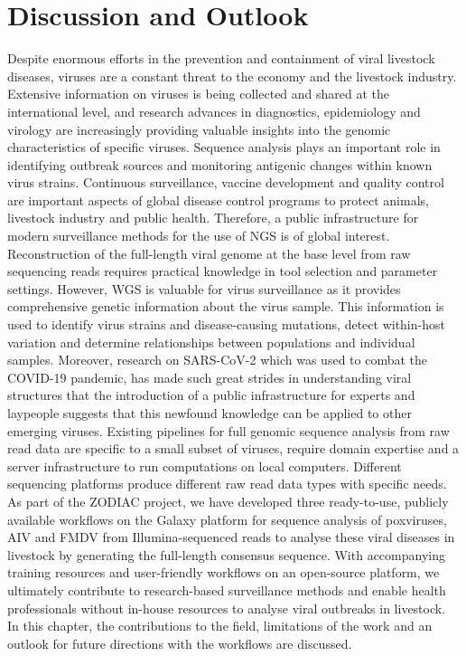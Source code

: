 \chapter{Discussion and Outlook}\label{chap:discussion}
Despite enormous efforts in the prevention and containment of viral livestock diseases, viruses are a constant threat to the economy and the livestock industry. Extensive information on viruses is being collected and shared at the international level, and research advances in diagnostics, epidemiology and virology are increasingly providing valuable insights into the genomic characteristics of specific viruses. Sequence analysis plays an important role in identifying outbreak sources and monitoring antigenic changes within known virus strains. Continuous surveillance, vaccine development and quality control are important aspects of global disease control programs to protect animals, livestock industry and public health. Therefore, a public infrastructure for modern surveillance methods for the use of \ac{NGS} is of global interest. Reconstruction of the full-length viral genome at the base level from raw sequencing reads requires practical knowledge in tool selection and parameter settings. However, \ac{WGS} is valuable for virus surveillance as it provides comprehensive genetic information about the virus sample. This information is used to identify virus strains and disease-causing mutations, detect within-host variation and determine relationships between populations and individual samples. Moreover, research on \ac{SARS-CoV-2} which was used to combat the \ac{COVID-19} pandemic, has made such great strides in understanding viral structures that the introduction of a public infrastructure for experts and laypeople suggests that this newfound knowledge can be applied to other emerging viruses. Existing pipelines for full genomic sequence analysis from raw read data are specific to a small subset of viruses, require domain expertise and a server infrastructure to run computations on local computers. Different sequencing platforms produce different raw read data types with specific needs. As part of the \ac{ZODIAC} project, we have developed three ready-to-use, publicly available workflows on the Galaxy platform for sequence analysis of poxviruses, \ac{AIV} and \ac{FMDV} from Illumina-sequenced reads to analyse these viral diseases in livestock by generating the full-length consensus sequence. With accompanying training resources and user-friendly workflows on an open-source platform, we ultimately contribute to research-based surveillance methods and enable health professionals without in-house resources to analyse viral outbreaks in livestock.\\
In this chapter, the contributions to the field, limitations of the work and an outlook for future directions with the workflows are discussed.

